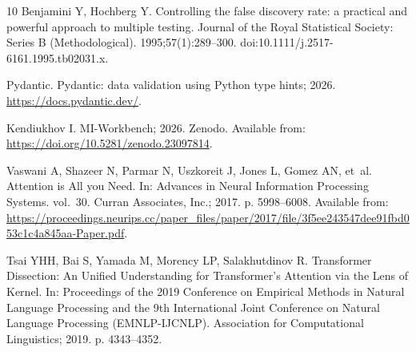 \documentclass[10pt,letterpaper]{article}
\providecommand{\DIFaddend}{} %
\DeclareRobustCommand{\DIFaddend}{\DIFOaddend \let\includegraphics\DIFOincludegraphics} %
\begin{document}
\begin{thebibliography}{10}
Benjamini Y, Hochberg Y.
\newblock Controlling the false discovery rate: a practical and powerful
  approach to multiple testing.
\newblock Journal of the Royal Statistical Society: Series B (Methodological).
  1995;57(1):289--300.
\newblock doi:{10.1111/j.2517-6161.1995.tb02031.x}.

{Pydantic}. Pydantic: data validation using {Python} type hints; 2026.
\newblock \url{https://docs.pydantic.dev/}.

Kendiukhov I. {MI-Workbench}; 2026.
\newblock Zenodo.
\newblock Available from: \url{https://doi.org/10.5281/zenodo.23097814}.

Vaswani A, Shazeer N, Parmar N, Uszkoreit J, Jones L, Gomez AN, et~al.
\newblock Attention is All you Need.
\newblock In: Advances in Neural Information Processing Systems. vol.~30.
  Curran Associates, Inc.; 2017. p. 5998--6008.
\newblock Available from:
  \url{https://proceedings.neurips.cc/paper_files/paper/2017/file/3f5ee243547dee91fbd053c1c4a845aa-Paper.pdf}.

Tsai YHH, Bai S, Yamada M, Morency LP, Salakhutdinov R.
\newblock Transformer Dissection: An Unified Understanding for Transformer's
  Attention via the Lens of Kernel.
\newblock In: Proceedings of the 2019 Conference on Empirical Methods in
  Natural Language Processing and the 9th International Joint Conference on
  Natural Language Processing (EMNLP-IJCNLP). Association for Computational
  Linguistics; 2019. p. 4343--4352.

\end{thebibliography}
\DIFaddend 
\end{document}

